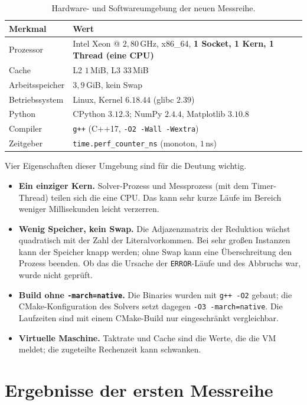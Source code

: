 \begin{table}[!ht]
	\centering
	\small
	\begin{tabularx}{\textwidth}{@{}L{4.0cm}Y@{}}
		\toprule
		Merkmal & Wert \\
		\midrule
		Prozessor & Intel Xeon @ $2{,}80$\,GHz, x86\_64, \textbf{1 Socket, 1 Kern, 1 Thread (eine CPU)} \\
		Cache & L2 $1$\,MiB, L3 $33$\,MiB \\
		Arbeitsspeicher & $3{,}9$\,GiB, kein Swap \\
		Betriebssystem & Linux, Kernel $6.18.44$ (glibc $2.39$) \\
		Python & CPython $3.12.3$; NumPy $2.4.4$, Matplotlib $3.10.8$ \\
		Compiler & \texttt{g++} (C++17, \texttt{-O2 -Wall -Wextra}) \\
		Zeitgeber & \texttt{time.perf\_counter\_ns} (monoton, $1$\,ns) \\
		\bottomrule
	\end{tabularx}
	\caption{Hardware- und Softwareumgebung der neuen Messreihe.}
	\label{tab:exp_hardware}
\end{table}

Vier Eigenschaften dieser Umgebung sind für die Deutung wichtig.

\begin{itemize}
	\item \textbf{Ein einziger Kern.} Solver-Prozess und Messprozess (mit dem Timer-Thread) teilen sich die eine CPU. Das kann sehr kurze Läufe im Bereich weniger Millisekunden leicht verzerren.
	\item \textbf{Wenig Speicher, kein Swap.} Die Adjazenzmatrix der Reduktion wächst quadratisch mit der Zahl der Literalvorkommen. Bei sehr großen Instanzen kann der Speicher knapp werden; ohne Swap kann eine Überschreitung den Prozess beenden. Ob das die Ursache der \texttt{ERROR}-Läufe und des Abbruchs war, wurde nicht geprüft.
	\item \textbf{Build ohne \texttt{-march=native}.} Die Binaries wurden mit \texttt{g++ -O2} gebaut; die CMake-Konfiguration des Solvers setzt dagegen \texttt{-O3 -march=native}. Die Laufzeiten sind mit einem CMake-Build nur eingeschränkt vergleichbar.
	\item \textbf{Virtuelle Maschine.} Taktrate und Cache sind die Werte, die die VM meldet; die zugeteilte Rechenzeit kann schwanken.
\end{itemize}

\section{Ergebnisse der ersten Messreihe}
\label{sec:exp_erste}

